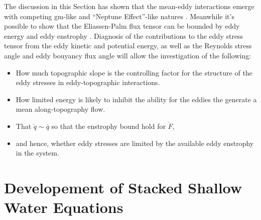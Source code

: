 \documentclass[12pt,a4paper]{report}
\newcommand*\thkmean[1]{\overline{#1}}
\newcommand*\spec[1]{\mathring{#1}}
\begin{document}
The discussion in this Section has shown that the mean-eddy interactions 
emerge with competing \gls{gm}-like and ``Neptune Effect''-like natures
\cite{adcock2000interactions}. Meanwhile  it's possible to show that
the Eliassen-Palm flux tensor can be bounded by eddy energy and eddy enstrophy
\cite{marshall2012framework}.
Diagnosis of the contributions to the eddy stress tensor from
the eddy kinetic and potential energy, as well as the Reynolds stress angle and eddy bouyancy flux angle will allow the investigation of the following:
\begin{itemize} 
		\item How much topographic slope is the controlling factor for the structure of the eddy stresses in eddy-topographic interactions.
		\item How limited energy is likely to inhibit the ability for the eddies the
			generate a mean along-topography flow.
	    \item That $\spec{q} \sim \thkmean{q}$ so that the enstrophy bound hold for $\spec{F}$,
		\item and hence, whether eddy stresses are limited by the available eddy enstrophy in the system.
\end{itemize} 
 

\chapter{Developement of Stacked Shallow Water Equations}
\label{sweq}
\end{document}
